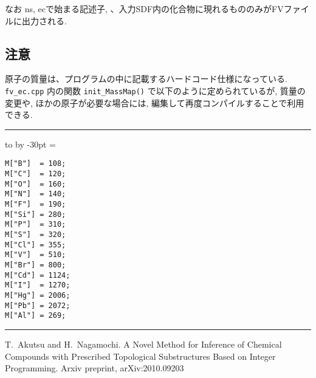 \documentclass[11pt, titlepage, dvipdfmx, twoside]{jarticle}
\newenvironment{myframe}{\begin{trivlist}\item[]
    \hrule
    \hbox to \linewidth\bgroup
    \advance\linewidth by -30pt
    \hsize=\linewidth
    \vrule\hfill
    \vbox\bgroup
    \vskip15pt
    \def\thempfootnote{\arabic{mpfootnote}}
    \begin{minipage}{\linewidth}}{%
    \end{minipage}\vskip15pt
    \egroup\hfill\vrule
    \egroup\hrule
\end{trivlist}}
\begin{document}
なお ns, ecで始まる記述子,
、入力SDF内の化合物に現れるもののみがFVファイルに出力される.


\subsection{注意}
\label{sec:caution}

原子の質量は、プログラムの中に記載するハードコード仕様になっている.
{\tt fv\_ec.cpp}
内の関数 {\tt init\_MassMap()}
で以下のように定められているが,
質量の変更や,
ほかの原子が必要な場合には,
編集して再度コンパイルすることで利用できる.

\begin{myframe}
\begin{verbatim}
M["B"]  = 108;
M["C"]  = 120;
M["O"]  = 160;
M["N"]  = 140;
M["F"]  = 190;
M["Si"] = 280;
M["P"]  = 310;
M["S"]  = 320;
M["Cl"] = 355;
M["V"]  = 510;
M["Br"] = 800;
M["Cd"] = 1124;
M["I"]  = 1270;
M["Hg"] = 2006;
M["Pb"] = 2072;
M["Al"] = 269;
\end{verbatim}
\end{myframe}

\begin{thebibliography}{9}
   T.~Akutsu and H.~Nagamochi.
   \newblock A Novel Method for Inference of Chemical Compounds with Prescribed Topological Substructures Based on Integer Programming.
   \newblock Arxiv preprint, arXiv:2010.09203
\end{thebibliography}
\end{document}
